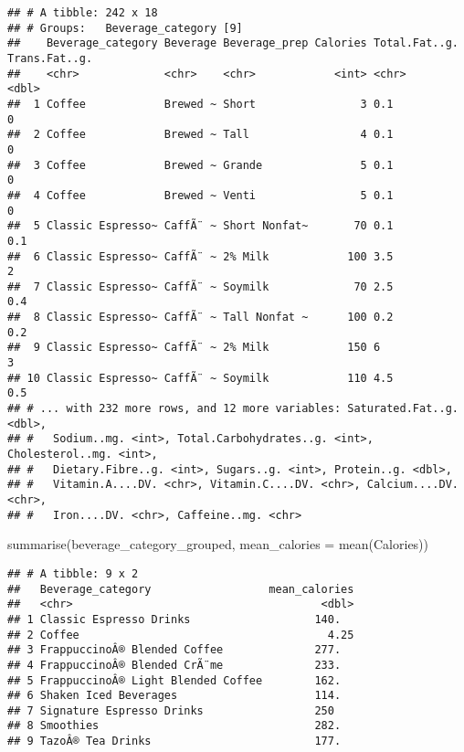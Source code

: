 \documentclass[
]{article}
\newenvironment{Shaded}{\begin{snugshade}}{\end{snugshade}}
\newcommand{\AttributeTok}[1]{\textcolor[rgb]{0.77,0.63,0.00}{#1}}
\newcommand{\FunctionTok}[1]{\textcolor[rgb]{0.00,0.00,0.00}{#1}}
\newcommand{\NormalTok}[1]{#1}
\begin{document}
\begin{verbatim}
## # A tibble: 242 x 18
## # Groups:   Beverage_category [9]
##    Beverage_category Beverage Beverage_prep Calories Total.Fat..g. Trans.Fat..g.
##    <chr>             <chr>    <chr>            <int> <chr>                 <dbl>
##  1 Coffee            Brewed ~ Short                3 0.1                     0  
##  2 Coffee            Brewed ~ Tall                 4 0.1                     0  
##  3 Coffee            Brewed ~ Grande               5 0.1                     0  
##  4 Coffee            Brewed ~ Venti                5 0.1                     0  
##  5 Classic Espresso~ CaffÃ¨ ~ Short Nonfat~       70 0.1                     0.1
##  6 Classic Espresso~ CaffÃ¨ ~ 2% Milk            100 3.5                     2  
##  7 Classic Espresso~ CaffÃ¨ ~ Soymilk             70 2.5                     0.4
##  8 Classic Espresso~ CaffÃ¨ ~ Tall Nonfat ~      100 0.2                     0.2
##  9 Classic Espresso~ CaffÃ¨ ~ 2% Milk            150 6                       3  
## 10 Classic Espresso~ CaffÃ¨ ~ Soymilk            110 4.5                     0.5
## # ... with 232 more rows, and 12 more variables: Saturated.Fat..g. <dbl>,
## #   Sodium..mg. <int>, Total.Carbohydrates..g. <int>, Cholesterol..mg. <int>,
## #   Dietary.Fibre..g. <int>, Sugars..g. <int>, Protein..g. <dbl>,
## #   Vitamin.A....DV. <chr>, Vitamin.C....DV. <chr>, Calcium....DV. <chr>,
## #   Iron....DV. <chr>, Caffeine..mg. <chr>
\end{verbatim}

\begin{Shaded}
\begin{Highlighting}[]
\FunctionTok{summarise}\NormalTok{(beverage\_category\_grouped, }\AttributeTok{mean\_calories =} \FunctionTok{mean}\NormalTok{(Calories))}
\end{Highlighting}
\end{Shaded}

\begin{verbatim}
## # A tibble: 9 x 2
##   Beverage_category                  mean_calories
##   <chr>                                      <dbl>
## 1 Classic Espresso Drinks                   140.  
## 2 Coffee                                      4.25
## 3 FrappuccinoÂ® Blended Coffee              277.  
## 4 FrappuccinoÂ® Blended CrÃ¨me              233.  
## 5 FrappuccinoÂ® Light Blended Coffee        162.  
## 6 Shaken Iced Beverages                     114.  
## 7 Signature Espresso Drinks                 250   
## 8 Smoothies                                 282.  
## 9 TazoÂ® Tea Drinks                         177.
\end{verbatim}
\end{document}
